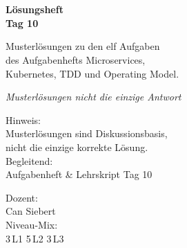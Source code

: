 \documentclass[11pt,a4paper,oneside]{article}
\newcommand{\caveatfontfallback}{\itshape}
\newcommand\caveatfont{\caveatfontfallback}%
\begin{document}
\begin{titlepage}
  \pagestyle{empty}
  \vspace*{1.5cm}
  \\[2pt]
  \noindent{\color{lpAccent}\rule{\linewidth}{1.2pt}}\\[4pt]

  \vspace{3cm}
  {\sffamily\fontsize{30}{34}\selectfont\bfseries\color{lpInk}L\"osungsheft\\Tag 10\par}

  \vspace{0.7cm}
  {\sffamily\large\color{lpGray}Musterl\"osungen zu den elf Aufgaben\\des Aufgabenhefts \textendash{} Microservices,\\Kubernetes, TDD und Operating Model.\par}

  \vspace{1.5cm}
  {\caveatfont\LARGE\color{lpGreen}Musterl\"osungen \textperiodcentered{} nicht die einzige Antwort}\par

  \vfill

  \noindent\begin{minipage}{0.55\linewidth}
    {\sffamily\footnotesize\color{lpGray}Hinweis:}\\
    {\sffamily\small\color{lpInk}Musterl\"osungen sind Diskussionsbasis,\\nicht die einzige korrekte L\"osung.}\\[10pt]
    {\sffamily\footnotesize\color{lpGray}Begleitend:}\\
    {\sffamily\small\color{lpInk}Aufgabenheft \& Lehrskript Tag 10}
  \end{minipage}\hfill
  \begin{minipage}{0.4\linewidth}
    \raggedleft
    {\sffamily\footnotesize\color{lpGray}Dozent:}\\
    {\sffamily\small\color{lpInk}Can Siebert}\\[10pt]
    {\sffamily\footnotesize\color{lpGray}Niveau-Mix:}\\
    {\sffamily\small\color{lpInk}3\,L1 \textperiodcentered{} 5\,L2 \textperiodcentered{} 3\,L3}
  \end{minipage}

  \vspace{0.5cm}
  \noindent{\color{lpAccent}\rule{\linewidth}{0.6pt}}
\end{titlepage}
\end{document}
